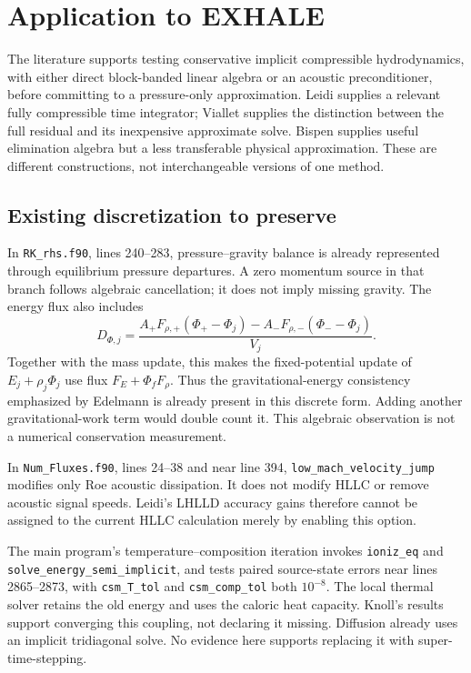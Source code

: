 \documentclass[english,a4paper]{my_memo}
\newcommand{\code}[1]{\nolinkurl{#1}}
\begin{document}
\section{Application to EXHALE}
The literature supports testing conservative implicit compressible hydrodynamics, with either direct block-banded linear algebra or an acoustic preconditioner, before committing to a pressure-only approximation. Leidi supplies a relevant fully compressible time integrator; Viallet supplies the distinction between the full residual and its inexpensive approximate solve. Bispen supplies useful elimination algebra but a less transferable physical approximation. These are different constructions, not interchangeable versions of one method.

\subsection{Existing discretization to preserve}
In \code{RK_rhs.f90}, lines 240--283, pressure--gravity balance is already represented through equilibrium pressure departures. A zero momentum source in that branch follows algebraic cancellation; it does not imply missing gravity. The energy flux also includes
\begin{equation}
 D_{\Phi,j}=\frac{A_+F_{\rho,+}(\Phi_+-\Phi_j)
                   -A_-F_{\rho,-}(\Phi_--\Phi_j)}{V_j}.
\end{equation}
Together with the mass update, this makes the fixed-potential update of $E_j+\rho_j\Phi_j$ use flux $F_E+\Phi_f F_\rho$. Thus the gravitational-energy consistency emphasized by Edelmann is already present in this discrete form. Adding another gravitational-work term would double count it. This algebraic observation is not a numerical conservation measurement.

In \code{Num_Fluxes.f90}, lines 24--38 and near line 394, \code{low_mach_velocity_jump} modifies only Roe acoustic dissipation. It does not modify HLLC or remove acoustic signal speeds. Leidi's LHLLD accuracy gains therefore cannot be assigned to the current HLLC calculation merely by enabling this option.

The main program's temperature--composition iteration invokes \code{ioniz_eq} and \code{solve_energy_semi_implicit}, and tests paired source-state errors near lines 2865--2873, with \code{csm_T_tol} and \code{csm_comp_tol} both $10^{-8}$. The local thermal solver retains the old energy and uses the caloric heat capacity. Knoll's results support converging this coupling, not declaring it missing. Diffusion already uses an implicit tridiagonal solve. No evidence here supports replacing it with super-time-stepping.
\end{document}
